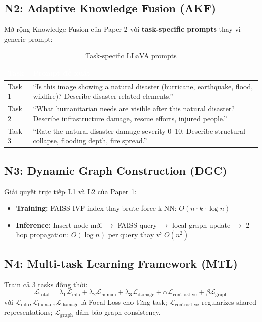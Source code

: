 \documentclass[12pt,a4paper]{article}
\begin{document}
\subsection{N2: Adaptive Knowledge Fusion (AKF)}

Mở rộng Knowledge Fusion của Paper 2 với \textbf{task-specific prompts} thay vì generic prompt:

\begin{table}[H]
\centering
\caption{Task-specific LLaVA prompts}
\begin{tabularx}{\textwidth}{l X}
\toprule
\rowcolor{tableheader}
\textcolor{white}{\textbf{Task}} & \textcolor{white}{\textbf{Prompt đề xuất}} \\
\midrule
Task 1 & ``Is this image showing a natural disaster (hurricane, earthquake, flood, wildfire)? Describe disaster-related elements.'' \\
Task 2 & ``What humanitarian needs are visible after this natural disaster? Describe infrastructure damage, rescue efforts, injured people.'' \\
Task 3 & ``Rate the natural disaster damage severity 0--10. Describe structural collapse, flooding depth, fire spread.'' \\
\bottomrule
\end{tabularx}
\end{table}

\subsection{N3: Dynamic Graph Construction (DGC)}

Giải quyết trực tiếp L1 và L2 của Paper 1:
\begin{itemize}
  \item \textbf{Training:} FAISS IVF index thay brute-force k-NN: $O(n \cdot k \cdot \log n)$
  \item \textbf{Inference:} Insert node mới $\rightarrow$ FAISS query $\rightarrow$ local graph update $\rightarrow$ 2-hop propagation: $O(\log n)$ per query thay vì $O(n^2)$
\end{itemize}

\subsection{N4: Multi-task Learning Framework (MTL)}

Train cả 3 tasks đồng thời:
\begin{equation}
\mathcal{L}_{\text{total}} = \lambda_1 \mathcal{L}_{\text{info}} + \lambda_2 \mathcal{L}_{\text{human}} + \lambda_3 \mathcal{L}_{\text{damage}} + \alpha \mathcal{L}_{\text{contrastive}} + \beta \mathcal{L}_{\text{graph}}
\label{eq:mtl-loss}
\end{equation}
với $\mathcal{L}_{\text{info}}, \mathcal{L}_{\text{human}}, \mathcal{L}_{\text{damage}}$ là Focal Loss cho từng task; $\mathcal{L}_{\text{contrastive}}$ regularizes shared representations; $\mathcal{L}_{\text{graph}}$ đảm bảo graph consistency.
\end{document}
